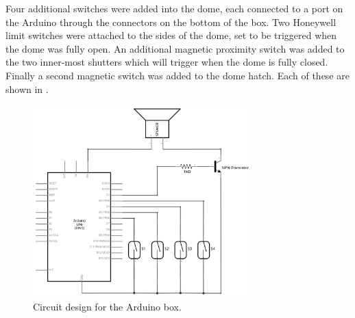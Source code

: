\begin{colsection}
\begin{colsection}
Four additional switches were added into the dome, each connected to a port on the Arduino through the connectors on the bottom of the box. Two Honeywell limit switches were attached to the sides of the dome, set to be triggered when the dome was fully open. An additional magnetic proximity switch was added to the two inner-most shutters which will trigger when the dome is fully closed. Finally a second magnetic switch was added to the dome hatch. Each of these are shown in .

\begin{figure}[t]
    \begin{center}
        \includegraphics[width=0.75\textwidth]{images/arduino.png}
    \end{center}
    \caption[Circuit design for the Arduino box]{
        Circuit design for the Arduino box.
    }\label{fig:arduino_circuit}
\end{figure}


\end{colsection}
\end{colsection}
